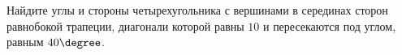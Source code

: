\begin{ex}
	\begin{condition}
		Найдите углы и стороны четырехугольника с вершинами в серединах сторон равнобокой трапеции, диагонали которой равны \( 10  \) и пересекаются под углом, равным \( 40\degree \).
	\end{condition}
\end{ex}
